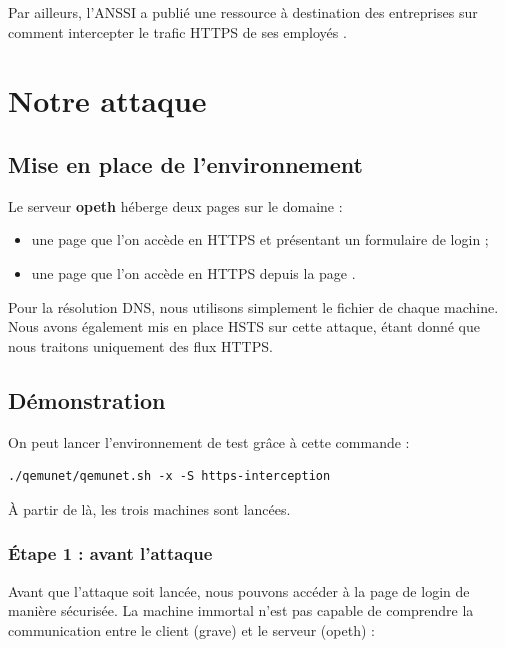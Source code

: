 Par ailleurs, l'ANSSI a publié une ressource à destination des entreprises sur comment intercepter le trafic HTTPS de ses employés \cite{anssi}.
\section{Notre attaque}

\subsection{Mise en place de l'environnement}

Le serveur \textbf{opeth} héberge deux pages sur le domaine  :

\begin{itemize}
\item une page  que l'on accède en HTTPS et présentant un formulaire de login ;
\item une page  que l'on accède en HTTPS depuis la page .
\end{itemize}

Pour la résolution DNS, nous utilisons simplement le fichier  de chaque machine. Nous avons également mis en place HSTS sur cette attaque, étant donné que nous traitons uniquement des flux HTTPS.

\subsection{Démonstration}

On peut lancer l'environnement de test grâce à cette commande :

\begin{verbatim}
./qemunet/qemunet.sh -x -S https-interception
\end{verbatim}

À partir de là, les trois machines sont lancées.

\subsubsection{Étape 1 : avant l'attaque}

Avant que l'attaque soit lancée, nous pouvons accéder à la page de login de manière sécurisée. La machine immortal n'est pas capable de comprendre la communication entre le client (grave) et le serveur (opeth) :

